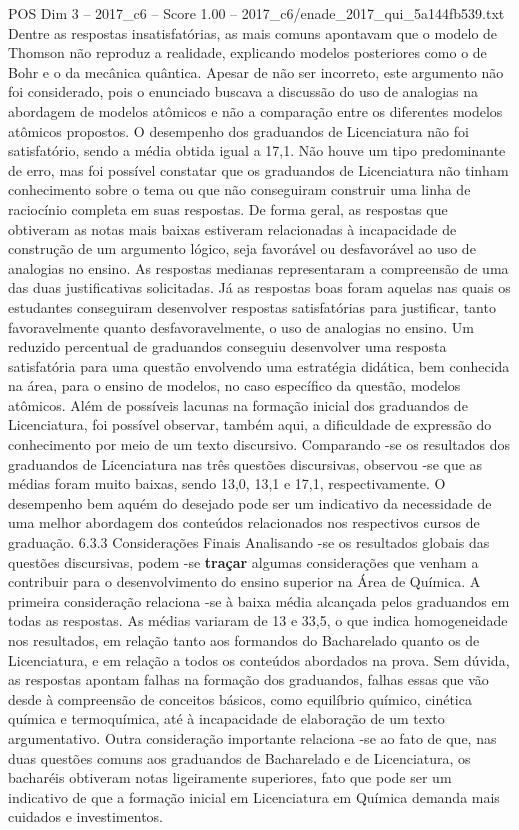 \begin{textsample}{POS Dim 3 – 2017\_c6 – Score 1.00 – 2017\_c6/enade\_2017\_qui\_5a144fb539.txt}
Dentre as respostas insatisfatórias, as mais comuns apontavam que o modelo de Thomson não reproduz a realidade, explicando modelos posteriores como o de Bohr e o da mecânica quântica.
Apesar de não ser incorreto, este argumento não foi considerado, pois o enunciado buscava a discussão do uso de analogias na abordagem de modelos atômicos e não a comparação entre os diferentes modelos atômicos propostos.
O desempenho dos graduandos de Licenciatura não foi satisfatório, sendo a média obtida igual a 17,1.
Não houve um tipo predominante de erro, mas foi possível constatar que os graduandos de Licenciatura não tinham conhecimento sobre o tema ou que não conseguiram construir uma linha de raciocínio completa em suas respostas.
De forma geral, as respostas que obtiveram as notas mais baixas estiveram relacionadas à incapacidade de construção de um argumento lógico, seja favorável ou desfavorável ao uso de analogias no ensino.
As respostas medianas representaram a compreensão de uma das duas justificativas solicitadas.
Já as respostas boas foram aquelas nas quais os estudantes conseguiram desenvolver respostas satisfatórias para justificar, tanto favoravelmente quanto desfavoravelmente, o uso de analogias no ensino.
Um reduzido percentual de graduandos conseguiu desenvolver uma resposta satisfatória para uma questão envolvendo uma estratégia didática, bem conhecida na área, para o ensino de modelos, no caso específico da questão, modelos atômicos.
Além de possíveis lacunas na formação inicial dos graduandos de Licenciatura, foi possível observar, também aqui, a dificuldade de expressão do conhecimento por meio de um texto discursivo.
Comparando -se os resultados dos graduandos de Licenciatura nas três questões discursivas, observou -se que as médias foram muito baixas, sendo 13,0, 13,1 e 17,1, respectivamente.
O desempenho bem aquém do desejado pode ser um indicativo da necessidade de uma melhor abordagem dos conteúdos relacionados nos respectivos cursos de graduação. 6.3.3 Considerações Finais Analisando -se os resultados globais das questões discursivas, podem -se \textbf{traçar} algumas considerações que venham a contribuir para o desenvolvimento do ensino superior na Área de Química.
A primeira consideração relaciona -se à baixa média alcançada pelos graduandos em todas as respostas.
As médias variaram de 13 e 33,5, o que indica homogeneidade nos resultados, em relação tanto aos formandos do Bacharelado quanto os de Licenciatura, e em relação a todos os conteúdos abordados na prova.
Sem dúvida, as respostas apontam falhas na formação dos graduandos, falhas essas que vão desde à compreensão de conceitos básicos, como equilíbrio químico, cinética química e termoquímica, até à incapacidade de elaboração de um texto argumentativo.
Outra consideração importante relaciona -se ao fato de que, nas duas questões comuns aos graduandos de Bacharelado e de Licenciatura, os bacharéis obtiveram notas ligeiramente superiores, fato que pode ser um indicativo de que a formação inicial em Licenciatura em Química demanda mais cuidados e investimentos.

\end{textsample}

